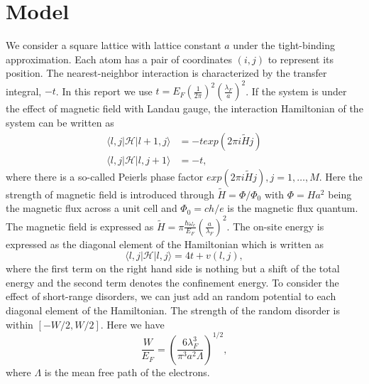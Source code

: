 \documentclass[journal]{IEEEtran}
\begin{document}
\section{Model}\label{Model}
We consider a square lattice with lattice constant $a$ under the tight-binding approximation. Each atom has a pair of
coordinates $(i,j)$ to represent its position. The nearest-neighbor interaction is characterized by the transfer
integral, $-t$. In this report we use $t=E_F(\frac{1}{2\pi})^2(\frac{\lambda_F}{a})^2$. If the system is under the
effect of magnetic field with Landau gauge, the interaction Hamiltonian of the system can be written as
\begin{equation}
    \begin{split}
        \langle l,j|\mathcal{H}|l+1,j\rangle&=-texp(2\pi i\tilde{H}j) \\
        \langle l,j|\mathcal{H}|l,j+1\rangle&=-t,
    \end{split}
    \label{eq:H}
\end{equation}
where there is a so-called Peierls phase factor $exp(2\pi i\tilde{H}j), j=1,\dots,M$. Here the strength of magnetic
field is introduced through $\tilde{H}=\Phi/\Phi_0$ with $\Phi=Ha^2$ being the magnetic flux across a unit cell and
$\Phi_0=ch/e$ is the magnetic flux quantum. The magnetic field is expressed as
$\tilde{H}=\pi\frac{\hbar\omega_c}{E_F}(\frac{a}{\lambda_F})^2$. The on-site energy is expressed as the diagonal element
of the Hamiltonian which is written as
\begin{equation}
    \langle l,j|\mathcal{H}|l,j\rangle=4t+v(l,j),
    \label{eq:H2}
\end{equation}
where the first term on the right hand side is nothing but a shift of the total energy and the second term denotes the
confinement energy. To consider the effect of short-range disorders, we can just add an random potential to each
diagonal element of the Hamiltonian. The strength of the random disorder is within $[-W/2,W/2]$. Here we have
\begin{equation}
    \frac{W}{E_F}=(\frac{6\lambda_F^3}{\pi^3a^2\Lambda})^{1/2},
    \label{}
\end{equation}
where $\Lambda$ is the mean free path of the electrons.
\end{document}
